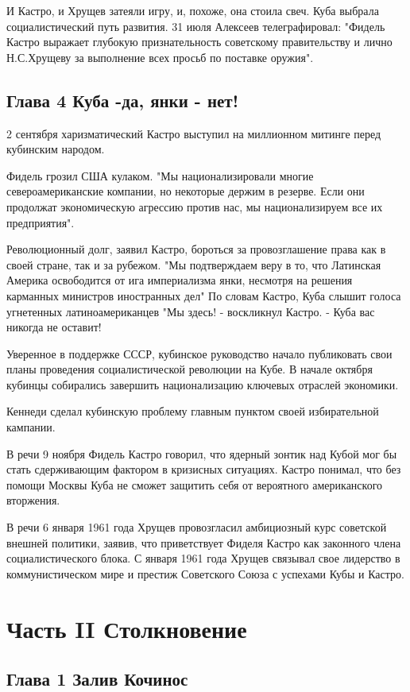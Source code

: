 \documentclass[14pt]{extreport}
\begin{document}
И Кастро, и Хрущев затеяли игру, и, похоже, она стоила свеч. Куба выбрала социалистический путь развития. 31 июля Алексеев телеграфировал: "Фидель Кастро выражает глубокую признательность советскому правительству и лично Н.С.Хрущеву за выполнение всех просьб по поставке оружия".

\section{Глава 4 Куба -да, янки - нет!}

2 сентября харизматический Кастро выступил на миллионном митинге перед кубинским народом.

Фидель грозил США кулаком. "Мы национализировали многие североамериканские компании, но некоторые держим в резерве. Если они продолжат экономическую агрессию против нас, мы национализируем все их предприятия".

Революционный долг, заявил Кастро, бороться за провозглашение права как в своей стране, так и за рубежом. "Мы подтверждаем веру в то, что Латинская Америка освободится от ига империализма янки, несмотря на решения карманных министров иностранных дел" По словам Кастро, Куба слышит голоса угнетенных латиноамериканцев "Мы здесь! - воскликнул Кастро. - Куба вас никогда не оставит!

Уверенное в поддержке СССР, кубинское руководство начало публиковать свои планы проведения социалистической революции на Кубе. В начале октября кубинцы собирались завершить национализацию ключевых отраслей экономики.

Кеннеди сделал кубинскую проблему главным пунктом своей избирательной кампании.

В речи 9 ноября Фидель Кастро говорил, что ядерный зонтик над Кубой мог бы стать сдерживающим фактором в кризисных ситуациях. Кастро понимал, что без помощи Москвы Куба не сможет защитить себя от вероятного американского вторжения.

В речи 6 января 1961 года Хрущев провозгласил амбициозный курс советской внешней политики, заявив, что приветствует Фиделя Кастро как законного члена социалистического блока. С января 1961 года Хрущев связывал свое лидерство в коммунистическом мире и престиж Советского Союза с успехами Кубы и Кастро.

\chapter{Часть II Столкновение}

\section{Глава 1 Залив Кочинос}
\end{document}
